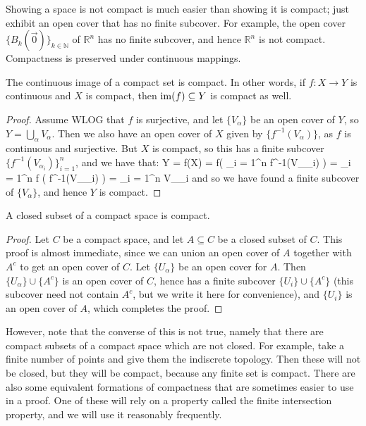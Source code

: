 	Showing a space is not compact is much easier than showing it is compact; just exhibit an open cover that has no finite 
	subcover. For example, the open cover $\{B_k(\vec{0})\}_{k\in\mathbb N}$ of $\mathbb R^n$ has no finite subcover, and 
	hence $\mathbb R^n$ is not compact. Compactness is preserved under continuous mappings.
	
	\begin{prop}
		The continuous image of a compact set is compact. In other words, if $f : X\rightarrow Y$ is continuous and $X$ is 
		compact, then $\mathrm{im}(f)\subseteq Y$ is compact as well.
	\end{prop}
	
	\begin{proof}
		Assume WLOG that $f$ is surjective, and let $\{V_\alpha\}$ be an open cover of $Y$, so $Y = \bigcup_\alpha V_
		\alpha$. Then we also have an open cover of $X$ given by $\{f^{-1}(V_\alpha)\}$, as $f$ is continuous and 
		surjective. But $X$ is compact, so this has a finite subcover $\{f^{-1}(V_{\alpha_i})\}_{i = 1}^n$, and we have that:
		\eq
			Y = f(X) = f\left( \bigcup_{i = 1}^n f^{-1}(V_{\alpha_i}) \right) = \bigcup_{i = 1}^n f \left( f^{-1}(V_{\alpha_i}) \right) = \bigcup_{i = 1}^n 
			V_{\alpha_i}
		\qe
		and so we have found a finite subcover of $\{V_\alpha\}$, and hence $Y$ is compact.
	\end{proof}
	
	\begin{prop}
		A closed subset of a compact space is compact.
	\end{prop}
	\begin{proof}
		Let $C$ be a compact space, and let $A\subseteq C$ be a closed subset of $C$. This proof is almost immediate, since we can union an open cover of $A$ together with $A^c$ to get an open cover of $C$. Let $\{U_\alpha\}$ be an open cover for $A$. Then $\{U_\alpha\}\cup \{A^c\}$ is an open cover of $C$, hence has a finite subcover $\{U_i\}\cup \{A^c\}$ (this subcover need not contain $A^c$, but we write it here for convenience), and $\{U_i\}$ is an open cover of $A$, which completes the proof. 
	\end{proof}
	
	However, note that the converse of this is not true, namely that there are compact subsets of a compact space which 
	are not closed. For example, take a finite number of points and give them the indiscrete topology. Then these will 
	not be closed, but they will be compact, because any finite set is compact. There are also some equivalent formations of 
	compactness that are sometimes easier to use in a proof. One of these will rely on a property called the finite intersection 
	property, and we will use it reasonably frequently.
	
